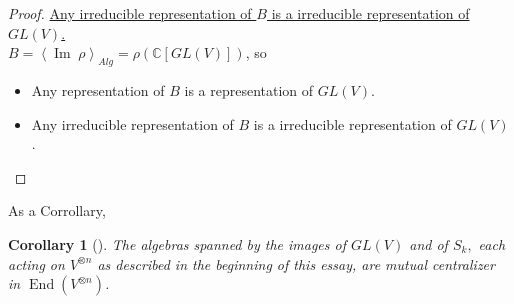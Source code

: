 \documentclass[11pt,oneside]{amsart}
\numberwithin{equation}{section}
\theoremstyle{plain}
\newtheorem{corollary}[theorem]{Corollary}
\theoremstyle{plain}
\numberwithin{equation}{section}
\theoremstyle{remark}
\newcommand{\End}{\operatorname{End}}
\newcommand{\im}{\operatorname{Im}\;}
\begin{document}
\begin{proof}
	\noindent\underline{Any irreducible representation of $B$ is a irreducible representation of $GL(V)$.}\\[0.2cm]
	$B=\left<\im \rho\right>_{Alg} = \rho(\mathbb{C}[GL(V)])$, so
	\begin{itemize}
		\item Any representation of $B$ is a representation of $GL(V)$.
		\item Any irreducible representation of $B$ is a irreducible representation of $GL(V)$.
	\end{itemize}
\end{proof}
	As a Corrollary,
	\begin{corollary}[]\cite[Thm 2.4.2]{howe1995perspectives}
		The algebras spanned by the images of $G L(V)$ and of $S_{k},$ each acting on $V^{\otimes n}$ as described in the beginning of this essay, are mutual centralizer in $\End(V^{\otimes n})$.
	\end{corollary}
	
\end{document}
